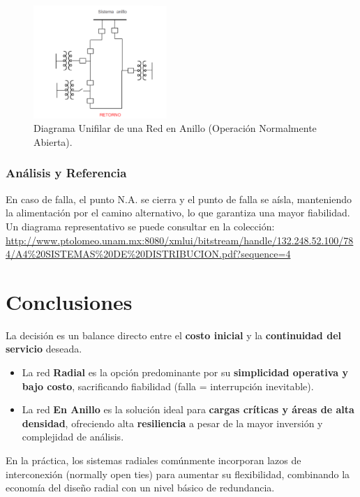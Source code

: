 \begin{figure}[ht!]
    \centering
    \includegraphics[width=0.45\textwidth]{fig_/ring_network_diagram.png} 
    \caption{Diagrama Unifilar de una Red en Anillo (Operación Normalmente Abierta).}
    \label{fig:anillo_unifilar}
\end{figure}

\subsubsection*{Análisis y Referencia}
En caso de falla, el punto N.A. se cierra y el punto de falla se aísla, manteniendo la alimentación por el camino alternativo, lo que garantiza una mayor fiabilidad. Un diagrama representativo se puede consultar en la colección: \url{http://www.ptolomeo.unam.mx:8080/xmlui/bitstream/handle/132.248.52.100/784/A4%20SISTEMAS%20DE%20DISTRIBUCION.pdf?sequence=4}


\section{Conclusiones}

La decisión es un balance directo entre el \textbf{costo inicial} y la \textbf{continuidad del servicio} deseada.

\begin{itemize}
    \item La red \textbf{Radial} es la opción predominante por su \textbf{simplicidad operativa y bajo costo}, sacrificando fiabilidad (falla = interrupción inevitable).
    \item La red \textbf{En Anillo} es la solución ideal para \textbf{cargas críticas y áreas de alta densidad}, ofreciendo alta \textbf{resiliencia} a pesar de la mayor inversión y complejidad de análisis.
\end{itemize}

En la práctica, los sistemas radiales comúnmente incorporan lazos de interconexión (normally open ties) para aumentar su flexibilidad, combinando la economía del diseño radial con un nivel básico de redundancia.